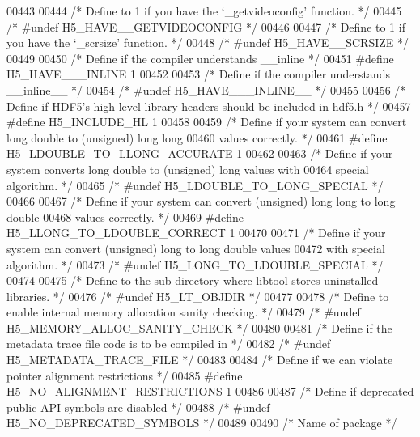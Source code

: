 \begin{DoxyCode}
{00443 
00444 \textcolor{comment}{/* Define to 1 if you have the `\_getvideoconfig' function. */}
00445 \textcolor{comment}{/* #undef H5\_HAVE\_\_GETVIDEOCONFIG */}
00446 
00447 \textcolor{comment}{/* Define to 1 if you have the `\_scrsize' function. */}
00448 \textcolor{comment}{/* #undef H5\_HAVE\_\_SCRSIZE */}
00449 
00450 \textcolor{comment}{/* Define if the compiler understands \_\_inline */}
00451 \textcolor{preprocessor}{#define H5\_HAVE\_\_\_INLINE 1}
00452 
00453 \textcolor{comment}{/* Define if the compiler understands \_\_inline\_\_ */}
00454 \textcolor{comment}{/* #undef H5\_HAVE\_\_\_INLINE\_\_ */}
00455 
00456 \textcolor{comment}{/* Define if HDF5's high-level library headers should be included in hdf5.h */}
00457 \textcolor{preprocessor}{#define H5\_INCLUDE\_HL 1}
00458 
00459 \textcolor{comment}{/* Define if your system can convert long double to (unsigned) long long}
00460 \textcolor{comment}{   values correctly. */}
00461 \textcolor{preprocessor}{#define H5\_LDOUBLE\_TO\_LLONG\_ACCURATE 1}
00462 
00463 \textcolor{comment}{/* Define if your system converts long double to (unsigned) long values with}
00464 \textcolor{comment}{   special algorithm. */}
00465 \textcolor{comment}{/* #undef H5\_LDOUBLE\_TO\_LONG\_SPECIAL */}
00466 
00467 \textcolor{comment}{/* Define if your system can convert (unsigned) long long to long double}
00468 \textcolor{comment}{   values correctly. */}
00469 \textcolor{preprocessor}{#define H5\_LLONG\_TO\_LDOUBLE\_CORRECT 1}
00470 
00471 \textcolor{comment}{/* Define if your system can convert (unsigned) long to long double values}
00472 \textcolor{comment}{   with special algorithm. */}
00473 \textcolor{comment}{/* #undef H5\_LONG\_TO\_LDOUBLE\_SPECIAL */}
00474 
00475 \textcolor{comment}{/* Define to the sub-directory where libtool stores uninstalled libraries. */}
00476 \textcolor{comment}{/* #undef H5\_LT\_OBJDIR */}
00477 
00478 \textcolor{comment}{/* Define to enable internal memory allocation sanity checking. */}
00479 \textcolor{comment}{/* #undef H5\_MEMORY\_ALLOC\_SANITY\_CHECK */}
00480 
00481 \textcolor{comment}{/* Define if the metadata trace file code is to be compiled in */}
00482 \textcolor{comment}{/* #undef H5\_METADATA\_TRACE\_FILE */}
00483 
00484 \textcolor{comment}{/* Define if we can violate pointer alignment restrictions */}
00485 \textcolor{preprocessor}{#define H5\_NO\_ALIGNMENT\_RESTRICTIONS 1}
00486 
00487 \textcolor{comment}{/* Define if deprecated public API symbols are disabled */}
00488 \textcolor{comment}{/* #undef H5\_NO\_DEPRECATED\_SYMBOLS */}
00489 
00490 \textcolor{comment}{/* Name of package */}
}
\end{DoxyCode}
